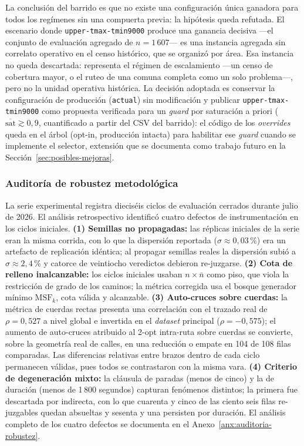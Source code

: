 La conclusión del barrido es que no existe una configuración única ganadora para todos los
regímenes sin una compuerta previa: la hipótesis queda refutada. El escenario donde
\texttt{upper-tmax-tmin9000} produce una ganancia decisiva ---el conjunto de evaluación
agregado de $n=1\,607$--- es una instancia agregada sin correlato operativo en el censo
histórico, que se organizó por área. Esa instancia no queda descartada: representa el
régimen de escalamiento ---un censo de cobertura mayor, o el ruteo de una comuna
completa como un solo problema---, pero no la unidad operativa histórica.
La decisión adoptada es conservar la configuración de producción (\texttt{actual}) sin
modificación y publicar \texttt{upper-tmax-tmin9000} como propuesta verificada para un
\textit{guard} por saturación a priori ($\overline{\text{sat}} \gtrsim 0{,}9$, cuantificado
a partir del CSV del barrido): el código de los \textit{overrides} queda en el árbol
(opt-in, producción intacta) para habilitar ese \textit{guard} cuando se implemente el
selector, extensión que se documenta como trabajo futuro en la
Sección~\ref{sec:posibles-mejoras}.

\subsubsection*{Auditoría de robustez metodológica}

La serie experimental registra dieciséis ciclos de evaluación cerrados durante julio de
2026. El análisis retrospectivo identificó cuatro defectos de instrumentación en los ciclos
iniciales. \textbf{(1) Semillas no propagadas:} las réplicas iniciales de la serie eran la misma
corrida, con lo que la dispersión reportada ($\sigma \approx 0{,}03\,\%$) era un artefacto
de replicación idéntica; al propagar semillas reales la dispersión subió a
$\sigma \approx 2{,}4\,\%$ y catorce de veintiocho veredictos debieron re-juzgarse.
\textbf{(2) Cota de relleno inalcanzable:} los ciclos iniciales usaban $n \times \bar{n}$
como piso, que viola la restricción de grado de los caminos; la métrica corregida usa el
bosque generador mínimo $\text{MSF}_k$, cota válida y alcanzable.
\textbf{(3) Auto-cruces sobre cuerdas:} la métrica de cuerdas rectas presenta una correlación
con el trazado real de $\rho = 0{,}527$ a nivel global e invertida en el \textit{dataset}
principal ($\rho = -0{,}575$); el aumento de auto-cruces atribuido al 2-opt intra-ruta
sobre cuerdas se convierte, sobre la geometría real de calles, en una reducción o empate en
104 de 108 filas comparadas. Las diferencias relativas entre brazos dentro de cada ciclo
permanecen válidas, pues todos se contrastaron con la misma vara.
\textbf{(4) Criterio de degeneración mixto:} la cláusula de paradas (menos de cinco) y la
de duración (menos de 1\,800 segundos) capturan fenómenos distintos; la primera fue
descartada por indirecta, con lo que cuarenta y cinco de las ciento seis filas re-juzgables
quedan absueltas y sesenta y una persisten por duración. El análisis completo de los cuatro
defectos se documenta en el Anexo~\ref{anx:auditoria-robustez}.

